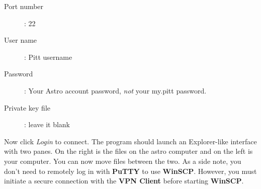 \documentclass[11pt]{article}
\begin{document}
\begin{description}
\item[Port number] : 22
\item[User name] : Pitt username
\item[Password] : Your Astro account password, \emph{not} your my.pitt password.
\item[Private key file] : leave it blank
\end{description}

Now click \emph{Login} to connect. The program should launch an Explorer-like interface with two panes. On the right is the files on the astro computer and on the left is your computer. You can now move files between the two. As a side note, you don't need to remotely log in with \textbf{PuTTY} to use \textbf{WinSCP}. However, you must initiate a secure connection with the \textbf{VPN Client} before starting \textbf{WinSCP}.
\end{document}
